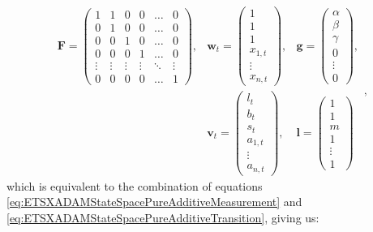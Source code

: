 \documentclass[
]{book}
\theoremstyle{definition}
\theoremstyle{definition}
\theoremstyle{definition}
\theoremstyle{definition}
\theoremstyle{remark}
\begin{document}
\begin{equation}
  \begin{aligned}
    \mathbf{F} =
    \begin{pmatrix} 1 & 1 & 0 & 0 & \dots & 0 \\
                    0 & 1 & 0 & 0 & \dots & 0 \\
                    0 & 0 & 1 & 0 & \dots & 0 \\
                    0 & 0 & 0 & 1 & \dots & 0 \\
                    \vdots & \vdots & \vdots & \vdots & \ddots & \vdots \\
                    0 & 0 & 0 & 0 & \dots & 1
    \end{pmatrix},
    & \mathbf{w}_t = \begin{pmatrix} 1 \\ 1 \\ 1 \\ x_{1,t} \\ \vdots \\x_{n,t} \end{pmatrix},
    & \mathbf{g} = \begin{pmatrix} \alpha \\ \beta \\ \gamma \\ 0 \\ \vdots \\ 0 \end{pmatrix}, \\
    & \mathbf{v}_{t} = \begin{pmatrix} l_t \\ b_t \\ s_t \\ a_{1,t} \\ \vdots \\ a_{n,t} \end{pmatrix},
    & \boldsymbol{l} = \begin{pmatrix} 1 \\ 1 \\ m \\ 1 \\ \vdots \\ 1 \end{pmatrix}
  \end{aligned},
  \label{eq:ETSXADAMAAAMatrices}
\end{equation}
which is equivalent to the combination of equations \eqref{eq:ETSXADAMStateSpacePureAdditiveMeasurement} and \eqref{eq:ETSXADAMStateSpacePureAdditiveTransition}, giving us:
\end{document}
